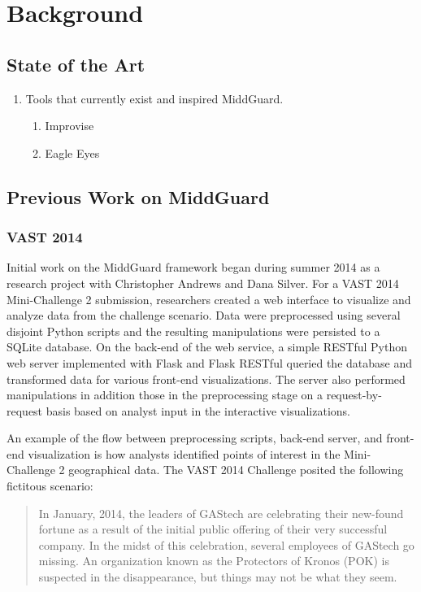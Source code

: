 \chapter{Background}

\section{State of the Art}
  \begin{enumerate}
    \item Tools that currently exist and inspired MiddGuard.
    \begin{enumerate}
      \item Improvise
      \item Eagle Eyes
    \end{enumerate}
  \end{enumerate}

\section{Previous Work on MiddGuard}
\subsection{VAST 2014}

Initial work on the MiddGuard framework began during summer 2014 as a research
project with Christopher Andrews and Dana Silver. For a VAST 2014 Mini-Challenge
2 \cite{vast2014mc2} submission, researchers created a web interface to
visualize and analyze data from the challenge scenario. Data were preprocessed
using several disjoint Python scripts and the resulting manipulations were
persisted to a SQLite database. On the back-end of the web service, a simple
RESTful Python web server implemented with Flask \cite{flask} and Flask RESTful
\cite{flask-restful} queried the database and transformed data for various
front-end visualizations. The server also performed manipulations in addition
those in the preprocessing stage on a request-by-request basis based on analyst
input in the interactive visualizations.

An example of the flow between preprocessing scripts, back-end server, and
front-end visualization is how analysts identified points of interest in the
Mini-Challenge 2 geographical data. The VAST 2014 Challenge \cite{vast2014}
posited the following fictitous scenario:

\begin{quote}

In January, 2014, the leaders of GAStech are celebrating their new-found fortune
as a result of the initial public offering of their very successful company. In
the midst of this celebration, several employees of GAStech go missing. An
organization known as the Protectors of Kronos (POK) is suspected in the
disappearance, but things may not be what they seem.

\end{quote}

